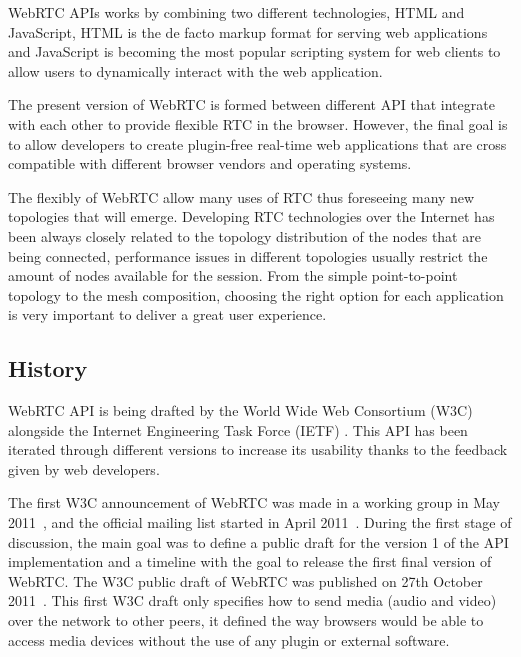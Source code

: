 WebRTC APIs works by combining two different technologies, HTML and JavaScript, HTML is the de facto markup format for serving web applications and JavaScript is becoming the most popular scripting system for web clients to allow users to dynamically interact with the web application. 

The present version of WebRTC is formed between different API that integrate with each other to provide flexible RTC in the browser. However, the final goal is to allow developers to create plugin-free real-time web applications that are cross compatible with different browser vendors and operating systems.

The flexibly of WebRTC allow many uses of RTC thus foreseeing many new topologies that will emerge. Developing RTC technologies over the Internet has been always closely related to the topology distribution of the nodes that are being connected, performance issues in different topologies usually restrict the amount of nodes available for the session. From the simple point-to-point topology to the mesh composition, choosing the right option for each application is very important to deliver a great user experience.

\subsection{History}

WebRTC API is being drafted by the World Wide Web Consortium (W3C)  alongside the Internet Engineering Task Force (IETF) . This API has been iterated through different versions to increase its usability thanks to the feedback given by web developers.

The first W3C announcement of WebRTC was made in a working group in May 2011~\cite{webrtcW3cgroup}, and the official mailing list started in April 2011~\cite{welcomeW3C}. During the first stage of discussion, the main goal was to define a public draft for the version 1 of the API implementation and a timeline with the goal to release the first final version of WebRTC. The W3C public draft of WebRTC was published on 27th October 2011~\cite{originalW3Cdraft}. This first W3C draft only specifies how to send media (audio and video) over the network to other peers, it defined the way browsers would be able to access media devices without the use of any plugin or external software.

